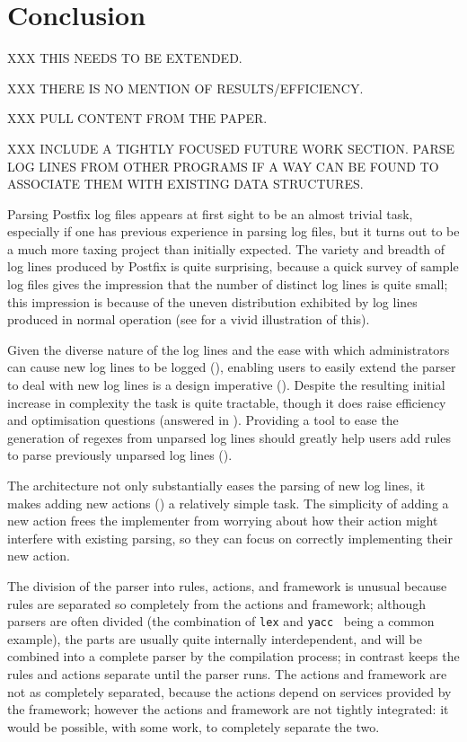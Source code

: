 \chapter{Conclusion}

\label{conclusion}

XXX THIS NEEDS TO BE EXTENDED\@.

XXX THERE IS NO MENTION OF RESULTS/EFFICIENCY\@.

XXX PULL CONTENT FROM THE PAPER\@.

XXX INCLUDE A TIGHTLY FOCUSED FUTURE WORK SECTION\@.  PARSE LOG LINES FROM
OTHER PROGRAMS IF A WAY CAN BE FOUND TO ASSOCIATE THEM WITH EXISTING DATA
STRUCTURES\@.

Parsing Postfix log files appears at first sight to be an almost trivial
task, especially if one has previous experience in parsing log files, but
it turns out to be a much more taxing project than initially expected.  The
variety and breadth of log lines produced by Postfix is quite surprising,
because a quick survey of sample log files gives the impression that the
number of distinct log lines is quite small; this impression is because of
the uneven distribution exhibited by log lines produced in normal operation
(see  for a vivid illustration of this).


Given the diverse nature of the log lines and the ease with which
administrators can cause new log lines to be logged (), enabling users to easily extend the parser to deal with new
log lines is a design imperative ().  Despite the
resulting initial increase in complexity the task is quite tractable,
though it does raise efficiency and optimisation questions (answered in
).  Providing a tool to ease the generation
of regexes from unparsed log lines should greatly help users add rules
to parse previously unparsed log lines ().


The architecture not only substantially eases the parsing of new log lines,
it makes adding new actions () a relatively simple task.  The simplicity of adding a new
action frees the implementer from worrying about how their action might
interfere with existing parsing, so they can focus on correctly
implementing their new action.


The division of the parser into rules, actions, and framework is unusual
because rules are separated so completely from the actions and framework;
although parsers are often divided (the combination of \texttt{lex} and
\texttt{yacc}~\cite{lex-and-yacc-book} being a common example), the parts
are usually quite internally interdependent, and will be combined into a
complete parser by the compilation process; in contrast \parsername{} keeps
the rules and actions separate until the parser runs.  The actions and
framework are not as completely separated, because the actions depend on
services provided by the framework; however the actions and framework are
not tightly integrated: it would be possible, with some work, to completely
separate the two.

